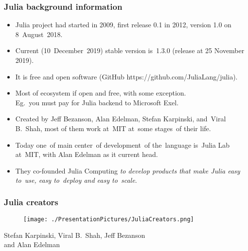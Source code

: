 \documentclass[10pt,t]{beamer}
\begin{document}
\begin{frame}
  \frametitle{Julia background information}


  \begin{itemize}

  \item Julia project had started in 2009, first release 0.1 in 2012,
    version 1.0 on 8~August~2018.

  \item Current (10~December~2019) stable version is~1.3.0 (release at 25
    November 2019).

  \item It is \alert{free} and \alert{open software} (GitHub
    {https://github.com/JuliaLang/julia}).

  \item Most of ecosystem if open and free, with \alert{some}
    exception. \\
    Eg.~you must pay for Julia backend to Microsoft Exel.

  \item Created by Jeff Bezanson, Alan Edelman, Stefan Karpinski,
    and~Viral B.~Shah, most of them work at~MIT at~some stages~of
    their life.

  \item Today one~of main center~of development~of the~language
    is~Julia Lab at~MIT, with Alan Edelman as it current head.

  \item They co-founded Julia Computing \emph{to develop products that
      make Julia easy to~use, easy to~deploy and easy to~scale}.

  \end{itemize}

\end{frame}





\begin{frame}
  \frametitle{Julia creators}


  \begin{figure}

    \centering

    \texttt{[image: ./PresentationPictures/JuliaCreators.png]}

  \end{figure}


  \begin{center}

    Stefan Karpinski, Viral B.~Shah, Jeff Bezanson \\
    \hspace{-12em} and Alan Edelman

  \end{center}

\end{frame}
\end{document}
